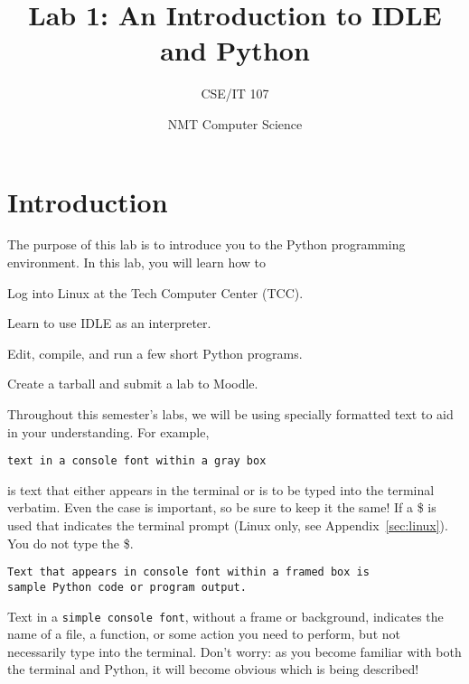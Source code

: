 \documentclass[12pt,hidelinks]{article}
\title{Lab 1: An Introduction to IDLE and Python}
\author{CSE/IT 107}
\date{NMT Computer Science}
\begin{document}
\maketitle

\section{Introduction}

The purpose of this lab is to introduce you to the Python programming environment. In this
lab, you will learn how to 
\begin{enumerate*}
\item Log into Linux at the Tech Computer Center (TCC).
\item Learn to use IDLE as an interpreter.
\item Edit, compile, and run a few short Python programs.
\item Create a tarball and submit a lab to Moodle.
\end{enumerate*}


Throughout this semester's labs, we will be using specially formatted text to aid in your understanding. For example,
\begin{lstlisting}[style=bash]
text in a console font within a gray box
\end{lstlisting}
is text that either appears in the terminal or is to be typed into the terminal
verbatim. Even the case is important, so be sure to keep it the same! If a \$ is
used that indicates the terminal prompt (Linux only, see
Appendix~\ref{sec:linux}). You do not type the \$.

\vspace{12pt}

\begin{lstlisting}[style=python]
Text that appears in console font within a framed box is 
sample Python code or program output.
\end{lstlisting}

\vspace{12pt}

Text in a \texttt{simple console font}, without a frame or background, indicates
the name of a file, a function, or some action you need to perform, but not
necessarily type into the terminal. Don't worry: as you become familiar with
both the terminal and Python, it will become obvious which is being described!
\end{document}
